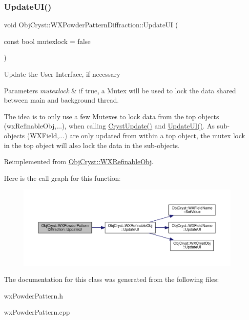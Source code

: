 \subsubsection{\texorpdfstring{UpdateUI()}{UpdateUI()}}
{\footnotesize\ttfamily void Obj\+Cryst\+::\+W\+X\+Powder\+Pattern\+Diffraction\+::\+Update\+UI (\begin{DoxyParamCaption}\item[{const bool}]{mutexlock = {\ttfamily false} }\end{DoxyParamCaption})\hspace{0.3cm}{\ttfamily [virtual]}}

Update the User Interface, if necessary


\begin{DoxyParams}{Parameters}
{\em mutexlock} & if true, a Mutex will be used to lock the data shared between main and background thread.\\
\hline
\end{DoxyParams}
The idea is to only use a few Mutexes to lock data from the top objects (wx\+Refinable\+Obj,...), when calling \mbox{\hyperlink{class_obj_cryst_1_1_w_x_powder_pattern_diffraction_a1da4c9c31433e1cee6bf77afca30818e}{Cryst\+Update()}} and \mbox{\hyperlink{class_obj_cryst_1_1_w_x_powder_pattern_diffraction_acc1ee5836a4db2466007fe9ebb540e01}{Update\+U\+I()}}. As sub-\/objects (\mbox{\hyperlink{class_obj_cryst_1_1_w_x_field}{W\+X\+Field}},...) are only updated from within a top object, the mutex lock in the top object will also lock the data in the sub-\/objects. 

Reimplemented from \mbox{\hyperlink{class_obj_cryst_1_1_w_x_refinable_obj_acbf70975a79661a73a1ae3c39c9c3045}{Obj\+Cryst\+::\+W\+X\+Refinable\+Obj}}.

Here is the call graph for this function\+:
\nopagebreak
\begin{figure}[H]
\begin{center}
\leavevmode
\includegraphics[width=350pt]{class_obj_cryst_1_1_w_x_powder_pattern_diffraction_acc1ee5836a4db2466007fe9ebb540e01_cgraph}
\end{center}
\end{figure}


The documentation for this class was generated from the following files\+:\begin{DoxyCompactItemize}
\item 
wx\+Powder\+Pattern.\+h\item 
wx\+Powder\+Pattern.\+cpp\end{DoxyCompactItemize}
